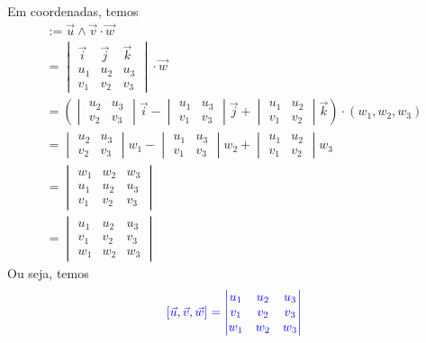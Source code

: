 Em coordenadas, temos
\begin{gather}
  [\vec{u},\vec{v},\vec{w}] := \vec{u}\land\vec{v}\cdot\vec{w} \\
  = \begin{vmatrix}
    \vec{i} & \vec{j} & \vec{k} \\
    u_1 & u_2 & u_3 \\
    v_1 & v_2 & v_3
  \end{vmatrix} \cdot \vec{w} \\
  = \left(
    \begin{vmatrix}
      u_2 & u_3\\
      v_2 & v_3
    \end{vmatrix}\vec{i} -
    \begin{vmatrix}
      u_1 & u_3 \\
      v_1 & v_3
    \end{vmatrix}\vec{j}  +
    \begin{vmatrix}
      u_1 & u_2\\
      v_1 & v_2
    \end{vmatrix}\vec{k}\right)\cdot(w_1,w_2,w_3)\\
  = \begin{vmatrix}
    u_2 & u_3\\
    v_2 & v_3
  \end{vmatrix}w_1 -
  \begin{vmatrix}
    u_1 & u_3 \\
    v_1 & v_3
  \end{vmatrix}w_2
  + \begin{vmatrix}
    u_1 & u_2\\
    v_1 & v_2
  \end{vmatrix}w_3\\
  = \begin{vmatrix}
    w_1 & w_2 & w_3 \\
    u_1 & u_2 & u_3 \\
    v_1 & v_2 & v_3
  \end{vmatrix} \\
  = \begin{vmatrix}
    u_1 & u_2 & u_3 \\
    v_1 & v_2 & v_3 \\
    w_1 & w_2 & w_3 
  \end{vmatrix}
\end{gather}
Ou seja, temos
\begin{equation}
  {\color{blue}[\vec{u},\vec{v},\vec{w}] = \begin{vmatrix}
    u_1 & u_2 & u_3 \\
    v_1 & v_2 & v_3 \\
    w_1 & w_2 & w_3 
  \end{vmatrix}}
\end{equation}

